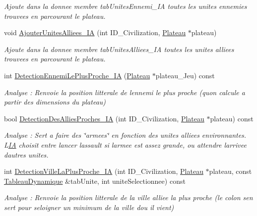 \begin{DoxyCompactItemize}
\begin{DoxyCompactList}\small\item\em Ajoute dans la donnee membre tab\+Unites\+Ennemi\+\_\+\+IA toutes les unites ennemies trouvees en parcourant le plateau. \end{DoxyCompactList}\item 
void \hyperlink{classIA_a7a37a63cb0ba3083e57e6f4e9fb30280}{Ajouter\+Unites\+Alliees\+\_\+\+IA} (int I\+D\+\_\+\+Civilization, \hyperlink{classPlateau}{Plateau} $\ast$plateau)
\begin{DoxyCompactList}\small\item\em Ajoute dans la donnee membre tab\+Unites\+Alliees\+\_\+\+IA toutes les unites alliees trouvees en parcourant le plateau. \end{DoxyCompactList}\item 
int \hyperlink{classIA_a4085c538669bc85766eaff6bb0597539}{Detection\+Ennemi\+Le\+Plus\+Proche\+\_\+\+IA} (\hyperlink{classPlateau}{Plateau} $\ast$plateau\+\_\+\+Jeu) const
\begin{DoxyCompactList}\small\item\em Analyse \+: Renvoie la position litterale de l\textquotesingle{}ennemi le plus proche (qu\textquotesingle{}on calcule a partir des dimensions du plateau) \end{DoxyCompactList}\item 
bool \hyperlink{classIA_adad21c86052cc274d27fa91b379d32c4}{Detection\+Des\+Allies\+Proches\+\_\+\+IA} (int I\+D\+\_\+\+Civilization, \hyperlink{classPlateau}{Plateau} $\ast$plateau) const
\begin{DoxyCompactList}\small\item\em Analyse \+: Sert a faire des \char`\"{}armees\char`\"{} en fonction des unites alliees environnantes. L\textquotesingle{}\hyperlink{classIA}{IA} choisit entre lancer l\textquotesingle{}assault si l\textquotesingle{}armee est assez grande, ou attendre l\textquotesingle{}arrivee d\textquotesingle{}autres unites. \end{DoxyCompactList}\item 
int \hyperlink{classIA_a520de200c4a27aaeb8a225291f7f3c78}{Detection\+Ville\+La\+Plus\+Proche\+\_\+\+IA} (int I\+D\+\_\+\+Civilization, \hyperlink{classPlateau}{Plateau} $\ast$plateau, const \hyperlink{classTableauDynamique}{Tableau\+Dynamique} \&tab\+Unite, int unite\+Selectionnee) const
\begin{DoxyCompactList}\small\item\em Analyse \+: Renvoie la position litterale de la ville alliee la plus proche (le colon s\textquotesingle{}en sert pour s\textquotesingle{}eloigner un minimum de la ville d\textquotesingle{}ou il vient) \end{DoxyCompactList}\item 

\end{DoxyCompactItemize}
